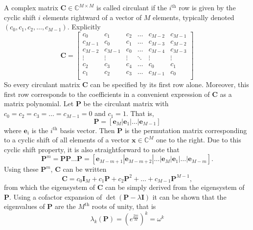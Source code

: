 \documentclass[letterpaper,12pt,oneside,final]{article}
\newcommand{\ve}[1]{\mathbf{#1}}           %
\newcommand{\m}[1]{\mathbf{#1}}               %
\newcommand{\field}[1]{\mathbb{#1}}
\newcommand{\Complex}{\field{C}}
\begin{document}
A complex matrix $\m{C} \in \Complex^{M \times M}$ is called circulant if the $i^{\text{th}}$ row is given by the cyclic shift $i$ elements rightward of a vector of $M$ elements, typically denoted $(c_0, c_1, c_2, \dots, c_{M-1})$. Explicitly
\begin{equation} \label{eq:explicitCirculant}
  \m{C} = \begin{bmatrix}
    c_0 & c_1 & c_2 & \dots & c_{M-2} & c_{M-1} \\
    c_{M-1} & c_0 & c_1 & \dots & c_{M-3} & c_{M-2} \\
    c_{M-2} & c_{M-1} & c_0 & \dots & c_{M-4} & c_{M-3} \\
    \vdots & \vdots & \vdots & \ddots & \vdots & \vdots \\
    c_2 & c_3 & c_4 & \dots & c_0 & c_1 \\
    c_1 & c_2 & c_3 & \dots & c_{M-1} & c_0 \\
    \end{bmatrix}
\end{equation}
So every circulant matrix $\m{C}$ can be specified by its first row alone. Moreover, this first row corresponds to the coefficients in a convenient expression of $\m{C}$ as a matrix polynomial. Let $\m{P}$ be the circulant matrix with $c_0 = c_2 = c_3 = \dots = c_{M-1} = 0$ and $c_1 = 1$. That is,
\begin{equation} \label{eq:pDef}
  \m{P} = [ \ve{e}_M | \ve{e}_1 | \dots | \ve{e}_{M-1} ]
\end{equation}
where $\ve{e}_i$ is the $i^{\text{th}}$ basis vector. Then $\m{P}$ is the permutation matrix corresponding to a cyclic shift of all elements of a vector $\ve{x} \in \Complex^M$ one to the right. Due to this cyclic shift property, it is also straightforward to note that
\begin{equation} \label{eq:powerPDef}
  \m{P}^m = \m{P} \m{P} \dots \m{P} = [ \ve{e}_{M-m+1} | \ve{e}_{M-m+2} | \dots | \ve{e}_M | \ve{e}_1 | \dots | \ve{e}_{M-m} ].
\end{equation}
Using these $\m{P}^m$, $\m{C}$ can be written
\begin{equation} \label{eq:circMatPol}
  \m{C} = c_0 \m{I}_M + c_1 \m{P} + c_2 \m{P}^2 + \dots + c_{M-1} \m{P}^{M-1},
\end{equation}
from which the eigensystem of $\m{C}$ can be simply derived from the eigensystem of $\m{P}$. Using a cofactor expansion of $\det (\m{P} - \lambda \m{I})$ it can be shown that the eigenvalues of $\m{P}$ are the $M^{\text{th}}$ roots of unity, that is
$$\lambda_k (\m{P}) = \left ( e^{\frac{2 \pi i}{M}} \right )^k = \omega^k$$
\end{document}
